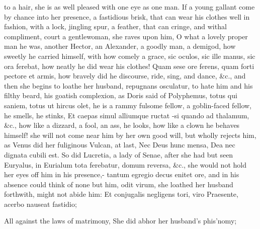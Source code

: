 {to a hair, she is as well pleased with one eye as one man. If a young
gallant come by chance into her presence, a fastidious brisk, that can
wear his clothes well in fashion, with a lock, jingling spur, a
feather, that can cringe, and withal compliment, court a gentlewoman,
she raves upon him, O what a lovely proper man he was, another Hector,
an Alexander, a goodly man, a demigod, how sweetly he carried himself,
with how comely a grace, sic oculos, sic ille manus, sic ora ferebat,
how neatly he did wear his clothes!  Quam sese ore ferens, quam
forti pectore et armis, how bravely did he discourse, ride, sing, and
dance, \&c., and then she begins to loathe her husband, repugnans
osculatur, to hate him and his filthy beard, his goatish complexion, as
Doris said of Polyphemus, totus qui saniem, totus ut hircus olet,
he is a rammy fulsome fellow, a goblin-faced fellow, he smells, he
stinks, Et caepas simul alliumque ructat -si quando ad thalamum,
\&c., how like a dizzard, a fool, an ass, he looks, how like a clown he
behaves himself! she will not come near him by her own good will,
but wholly rejects him, as Venus did her fuliginous Vulcan, at last,
Nec Deus hunc mensa, Dea nec dignata cubili est. So did Lucretia,
a lady of Senae, after she had but seen Euryalus, in Eurialum tota
ferebatur, domum reversa, \&c., she would not hold her eyes off him in
his presence,- tantum egregio decus enitet ore, and in his
absence could think of none but him, odit virum, she loathed her
husband forthwith, might not abide him:
Et conjugalis negligens tori, viro
Praesente, acerbo nauseat fastidio;

All against the laws of matrimony,
She did abhor her husband's phis'nomy;

}
